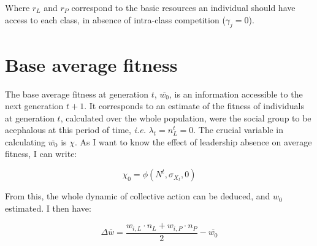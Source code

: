 \documentclass[a4paper]{article}
\begin{document}
Where $r_L$ and $r_P$ correspond to the basic resources an individual should have access to each class, in absence of intra-class competition ($\gamma_j=0$).

\section{Base average fitness}

The base average fitness at generation $t$, $\overline{w_0}$, is an information accessible to the next generation $t+1$. It corresponds to an estimate of the fitness of individuals at generation $t$, calculated over the whole population, were the social group to be acephalous at this period of time, \textit{i.e.} $\lambda_t=n_L^t=0$. The crucial variable in calculating $\overline{w_0}$ is $\chi$. As I want to know the effect of leadership absence on average fitness, I can write:

\begin{equation}
	\chi_0=\phi(N^t,\sigma_{X_t},0)
\end{equation}

From this, the whole dynamic of collective action can be deduced, and $w_0$ estimated. I then have:

\begin{equation}
	\Delta\bar{w}=\frac{w_{i,L}\cdot n_L+w_{i,P}\cdot n_P}{2}-\overline{w_0}
\end{equation}
%
%
\end{document}
